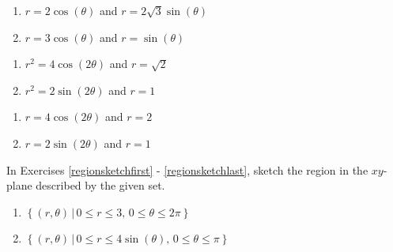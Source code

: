 \documentclass{ximera}
\begin{document}
\begin{multicols}{2} 

\begin{enumerate}

\setcounter{enumi}{\value{HW}}

\item $r = 2\cos(\theta)$ and $r = 2\sqrt{3} \sin(\theta)$
\item $r = 3\cos(\theta)$ and $r = \sin(\theta)$

\setcounter{HW}{\value{enumi}}

\end{enumerate}

\end{multicols}

\begin{multicols}{2} 

\begin{enumerate}

\setcounter{enumi}{\value{HW}}

\item $r^2 = 4\cos(2\theta)$ and $r = \sqrt{2}$
\item $r^{2} = 2\sin(2\theta)$ and $r = 1$

\setcounter{HW}{\value{enumi}}

\end{enumerate}

\end{multicols}

\begin{multicols}{2} 

\begin{enumerate}

\setcounter{enumi}{\value{HW}}

\item $r = 4\cos(2\theta)$ and $r=2$
\item $r = 2\sin(2\theta)$ and $r = 1$ \label{findpolarintlast}

\setcounter{HW}{\value{enumi}}

\end{enumerate}

\end{multicols}

In Exercises \ref{regionsketchfirst} - \ref{regionsketchlast}, sketch the region in the $xy$-plane described by the given set.

\begin{multicols}{2} 

\begin{enumerate}

\setcounter{enumi}{\value{HW}}

\item $\left\{ (r,\theta) \, | \, 0 \leq r \leq 3, \,0 \leq \theta \leq 2\pi \right\}$ \label{regionsketchfirst}
\item $\left\{ (r,\theta) \, | \, 0 \leq r \leq 4\sin(\theta), \,0 \leq \theta \leq \pi \right\}$

\setcounter{HW}{\value{enumi}}

\end{enumerate}

\end{multicols}
\end{document}
